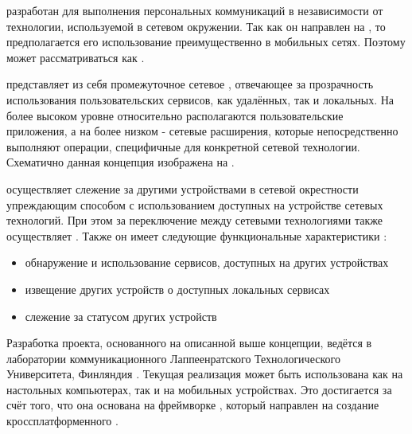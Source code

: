 \Sentence
\PeerHood разработан для выполнения персональных коммуникаций в независимости от технологии, 
используемой в сетевом окружении.
\Sentence
Так как он направлен на , то предполагается его использование 
преимущественно в мобильных сетях.
\Sentence
Поэтому \PeerHood может рассматриваться как  
.

\Sentence
\PeerHood представляет из себя промежуточное сетевое , отвечающее за 
прозрачность использования пользовательских сервисов, как удалённых, так и локальных.
\Sentence
На более высоком уровне относительно \PeerHood располагаются пользовательские приложения, а на 
более низком - сетевые расширения, которые непосредственно выполняют операции, специфичные для 
конкретной сетевой технологии.
\Sentence
Схематично данная концепция изображена на .


\Sentence
\PeerHood осуществляет слежение за другими устройствами в сетевой окрестности упреждающим способом 
с использованием доступных на устройстве сетевых технологий.
\Sentence
При этом за переключение между сетевыми технологиями также осуществляет \PeerHood.
\Sentence
Также он имеет следующие функциональные характеристики :
\begin{itemize}
	\item обнаружение и использование сервисов, доступных на других устройствах
	\item извещение других устройств о доступных локальных сервисах
	\item слежение за статусом других устройств
\end{itemize}

\Sentence
Разработка проекта, основанного на описанной выше концепции, ведётся в лаборатории 
коммуникационного  Лаппеенратского Технологического Университета, 
Финляндия .
\Sentence
Текущая реализация \PeerHood может быть использована как на настольных компьютерах, так и на 
мобильных устройствах. 
\Sentence
Это достигается за счёт того, что она основана на фреймворке \Qt 
{}, который направлен на создание кроссплатформенного .
